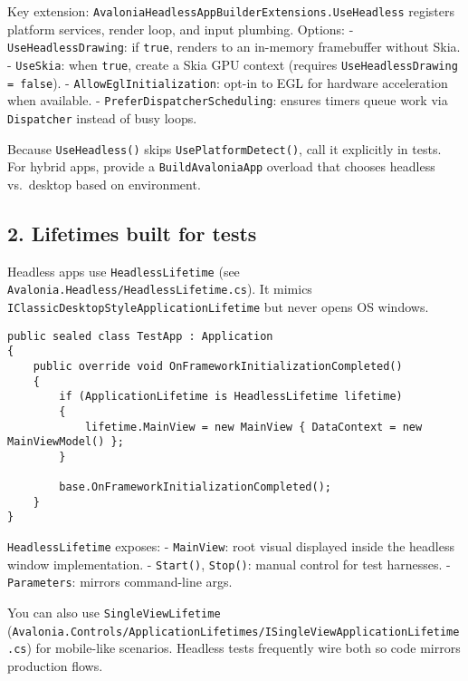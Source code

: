 Key extension:
\passthrough{\lstinline!AvaloniaHeadlessAppBuilderExtensions.UseHeadless!}
registers platform services, render loop, and input plumbing. Options: -
\passthrough{\lstinline!UseHeadlessDrawing!}: if
\passthrough{\lstinline!true!}, renders to an in-memory framebuffer
without Skia. - \passthrough{\lstinline!UseSkia!}: when
\passthrough{\lstinline!true!}, create a Skia GPU context (requires
\passthrough{\lstinline!UseHeadlessDrawing = false!}). -
\passthrough{\lstinline!AllowEglInitialization!}: opt-in to EGL for
hardware acceleration when available. -
\passthrough{\lstinline!PreferDispatcherScheduling!}: ensures timers
queue work via \passthrough{\lstinline!Dispatcher!} instead of busy
loops.

Because \passthrough{\lstinline!UseHeadless()!} skips
\passthrough{\lstinline!UsePlatformDetect()!}, call it explicitly in
tests. For hybrid apps, provide a
\passthrough{\lstinline!BuildAvaloniaApp!} overload that chooses
headless vs.~desktop based on environment.

\subsection{2. Lifetimes built for
tests}\label{lifetimes-built-for-tests}

Headless apps use \passthrough{\lstinline!HeadlessLifetime!} (see
\passthrough{\lstinline!Avalonia.Headless/HeadlessLifetime.cs!}). It
mimics \passthrough{\lstinline!IClassicDesktopStyleApplicationLifetime!}
but never opens OS windows.

\begin{lstlisting}
public sealed class TestApp : Application
{
    public override void OnFrameworkInitializationCompleted()
    {
        if (ApplicationLifetime is HeadlessLifetime lifetime)
        {
            lifetime.MainView = new MainView { DataContext = new MainViewModel() };
        }

        base.OnFrameworkInitializationCompleted();
    }
}
\end{lstlisting}

\passthrough{\lstinline!HeadlessLifetime!} exposes: -
\passthrough{\lstinline!MainView!}: root visual displayed inside the
headless window implementation. - \passthrough{\lstinline!Start()!},
\passthrough{\lstinline!Stop()!}: manual control for test harnesses. -
\passthrough{\lstinline!Parameters!}: mirrors command-line args.

You can also use \passthrough{\lstinline!SingleViewLifetime!}
(\passthrough{\lstinline!Avalonia.Controls/ApplicationLifetimes/ISingleViewApplicationLifetime.cs!})
for mobile-like scenarios. Headless tests frequently wire both so code
mirrors production flows.


